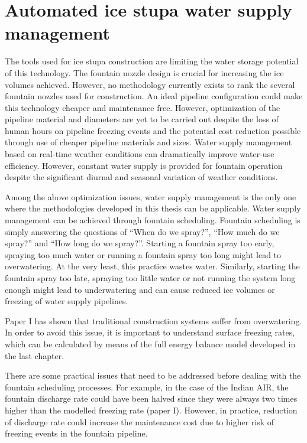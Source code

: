 \section{Automated ice stupa water supply management}

The tools used for ice stupa construction are limiting the water storage potential of this technology. The
fountain nozzle design is crucial for increasing the ice volumes achieved. However, no methodology currently
exists to rank the several fountain nozzles used for construction. An ideal pipeline configuration could make
this technology cheaper and maintenance free. However, optimization of the pipeline material and diameters are
yet to be carried out despite the loss of human hours on pipeline freezing events and the potential cost
reduction possible through use of cheaper pipeline materials and sizes. Water supply management based on
real-time weather conditions can dramatically improve water-use efficiency. However, constant water supply is
provided for fountain operation despite the significant diurnal and seasonal variation of weather conditions.

Among the above optimization issues, water supply management is the only one where the methodologies developed
in this thesis can be applicable. Water supply management can be achieved through fountain scheduling. Fountain
scheduling is simply answering the questions of “When do we spray?”, “How much do we spray?” and “How long do we
spray?”. Starting a fountain spray too early, spraying too much water or running a fountain spray too long might
lead to overwatering. At the very least, this practice wastes water.  Similarly, starting the fountain spray too
late, spraying too little water or not running the system long enough might lead to underwatering and can cause
reduced ice volumes or freezing of water supply pipelines.

Paper I has shown that traditional construction systems suffer from overwatering. In order to avoid this issue,
it is important to understand surface freezing rates, which can be calculated by means of the full energy
balance model developed in the last chapter.

There are some practical issues that need to be addressed before dealing with the fountain scheduling processes.
For example, in the case of the Indian AIR, the fountain discharge rate could have been halved since they were
always two times higher than the modelled freezing rate (paper I). However, in practice, reduction of discharge
rate could increase the maintenance cost due to higher risk of freezing events in the fountain pipeline.

